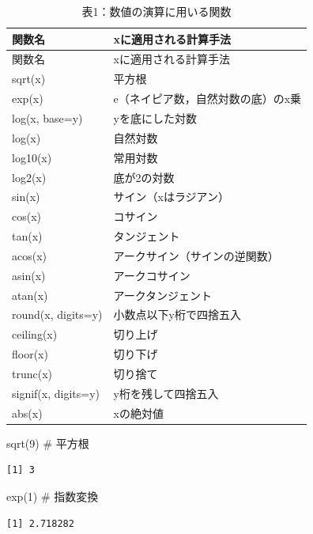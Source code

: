 \documentclass[
  letterpaper,
  DIV=11,
  numbers=noendperiod]{scrreprt}
\newenvironment{Shaded}{\begin{snugshade}}{\end{snugshade}}
\newcommand{\CommentTok}[1]{\textcolor[rgb]{0.37,0.37,0.37}{#1}}
\newcommand{\DecValTok}[1]{\textcolor[rgb]{0.68,0.00,0.00}{#1}}
\newcommand{\FunctionTok}[1]{\textcolor[rgb]{0.28,0.35,0.67}{#1}}
\newcommand{\NormalTok}[1]{\textcolor[rgb]{0.00,0.23,0.31}{#1}}
\begin{document}
\begin{longtable}[]{@{}ll@{}}
\caption{表1：数値の演算に用いる関数}\tabularnewline
\toprule()
関数名 & xに適用される計算手法 \\
\midrule()
\endfirsthead
\toprule()
関数名 & xに適用される計算手法 \\
\midrule()
\endhead
sqrt(x) & 平方根 \\
exp(x) & e（ネイピア数，自然対数の底）のx乗 \\
log(x, base=y) & yを底にした対数 \\
log(x) & 自然対数 \\
log10(x) & 常用対数 \\
log2(x) & 底が2の対数 \\
sin(x) & サイン（xはラジアン） \\
cos(x) & コサイン \\
tan(x) & タンジェント \\
acos(x) & アークサイン（サインの逆関数） \\
asin(x) & アークコサイン \\
atan(x) & アークタンジェント \\
round(x, digits=y) & 小数点以下y桁で四捨五入 \\
ceiling(x) & 切り上げ \\
floor(x) & 切り下げ \\
trunc(x) & 切り捨て \\
signif(x, digits=y) & y桁を残して四捨五入 \\
abs(x) & xの絶対値 \\
\bottomrule()
\end{longtable}

\begin{Shaded}
\begin{Highlighting}[]
\FunctionTok{sqrt}\NormalTok{(}\DecValTok{9}\NormalTok{) }\CommentTok{\# 平方根}
\end{Highlighting}
\end{Shaded}

\begin{verbatim}
[1] 3
\end{verbatim}

\begin{Shaded}
\begin{Highlighting}[]
\FunctionTok{exp}\NormalTok{(}\DecValTok{1}\NormalTok{) }\CommentTok{\# 指数変換}
\end{Highlighting}
\end{Shaded}

\begin{verbatim}
[1] 2.718282
\end{verbatim}
\end{document}
